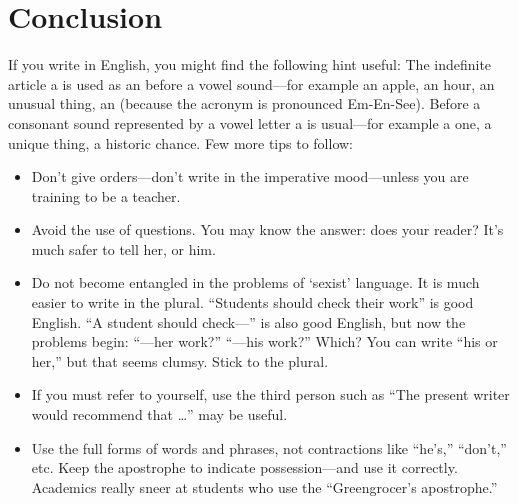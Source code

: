 \chapter{Conclusion}
\label{chap:six}

If you write in English, you might find the following hint
useful: The indefinite article a is used as an before a
vowel sound---for example an apple, an hour, an unusual
thing, an (because the acronym is pronounced Em-En-See). Before a consonant sound represented
by a vowel letter a is usual---for example a one, a
unique thing, a historic chance. Few more tips to follow:


\begin{itemize}
\item Don't give orders---don't write in the imperative mood---unless you are training to be a teacher.
\item Avoid the use of questions. You may know the answer: does your reader? It's much safer to tell her, or him.
\item Do not become entangled in the problems of `sexist' language. It is much easier to write in the plural. ``Students should check their work'' is good English. ``A student should check---'' is also good English, but now the problems begin: ``---her work?'' ``---his work?'' Which? You can write ``his or her,'' but that seems clumsy. Stick to the plural.
\item If you must refer to yourself, use the third person such as ``The present writer would recommend that \ldots'' may be useful.
\item Use the full forms of words and phrases, not contractions like ``he's,'' ``don't,'' etc. Keep the apostrophe to indicate possession---and use it correctly. Academics really sneer at students who use the ``Greengrocer's apostrophe.''
\end{itemize}


